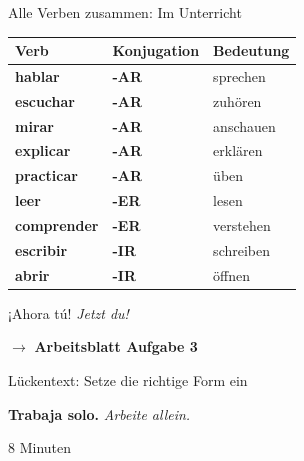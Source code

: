 \documentclass[aspectratio=169, 11pt]{beamer}
\newcommand{\seriftext}[1]{{\fontfamily{ppl}\selectfont #1}}
\newcommand{\es}[1]{\seriftext{\textbf{#1}}}
\newcommand{\de}[1]{\textit{\textcolor{mittelgrau}{#1}}}
\newcommand{\abmark}[1]{{\Large$\rightarrow$ \textbf{Arbeitsblatt Aufgabe #1}}}
\newcommand{\zeit}[1]{{\small\textcolor{mittelgrau}{#1}}}
\newcommand{\ender}[1]{\textcolor{endungER}{\textbf{#1}}}
\newcommand{\endir}[1]{\textcolor{endungIR}{\textbf{#1}}}
\newcommand{\endar}[1]{\textcolor{endungAR}{\textbf{#1}}}
\begin{document}
\begin{frame}{Alle Verben zusammen: Im Unterricht}
    \vspace{0.3cm}

    \renewcommand{\arraystretch}{1.6}
    {\small
    \begin{tabular}{lll}
        \toprule
        \textbf{Verb} & \textbf{Konjugation} & \textbf{Bedeutung} \\
        \midrule
        \es{hablar} & \endar{-AR} & sprechen \\
        \es{escuchar} & \endar{-AR} & zuhören \\
        \es{mirar} & \endar{-AR} & anschauen \\
        \es{explicar} & \endar{-AR} & erklären \\
        \es{practicar} & \endar{-AR} & üben \\
        \midrule
        \es{leer} & \ender{-ER} & lesen \\
        \es{comprender} & \ender{-ER} & verstehen \\
        \midrule
        \es{escribir} & \endir{-IR} & schreiben \\
        \es{abrir} & \endir{-IR} & öffnen \\
        \bottomrule
    \end{tabular}}
\end{frame}


\begin{frame}{¡Ahora tú! \de{Jetzt du!}}
    \vspace{1cm}

    \begin{center}
        \abmark{3}

        \vspace{0.8cm}

        {\large Lückentext: Setze die richtige Form ein}

        \vspace{0.8cm}

        \es{Trabaja solo.} \de{Arbeite allein.}

        \vspace{0.5cm}

        \zeit{8 Minuten}
    \end{center}
\end{frame}
\end{document}
